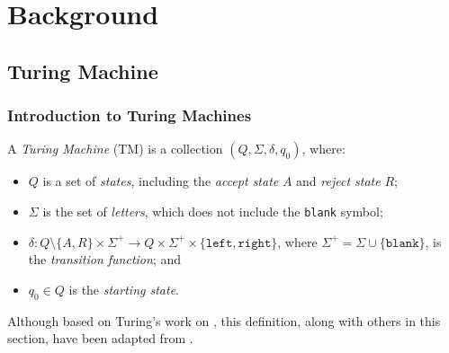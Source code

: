 \chapter{Background}
\section{Turing Machine}
\subsection{Introduction to Turing Machines}
A \emph{Turing Machine} (TM) is a collection $(Q, \Sigma, \delta, q_0)$, where:
\begin{itemize}
    \item $Q$ is a set of \emph{states}, including the \emph{accept state} $A$ and \emph{reject state} $R$;
    \item $\Sigma$ is the set of \emph{letters}, which does not include the \texttt{blank} symbol;
    \item $\delta \colon Q \setminus \{A, R\} \times \Sigma^+ \to Q \times \Sigma^+ \times \{\texttt{left}, \texttt{right}\}$, where $\Sigma^+ = \Sigma \cup \{\texttt{blank}\}$, is the \emph{transition function}; and
    \item $q_0 \in Q$ is the \emph{starting state}.
\end{itemize}
Although based on Turing's work on \cite{turing1936computable}, this definition, along with others in this section, have been adapted from \cite{hopcroft2001automata}.

